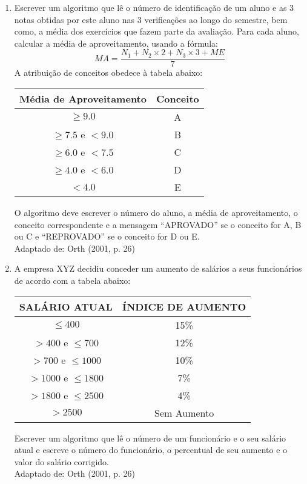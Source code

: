 \documentclass[onecolumn,a4paper,10pt]{report}
\newcommand{\+}{\, + \,}
\newcommand{\<}{\hspace*{-0.4cm}}
\begin{document}
\begin{enumerate}[1.]
\item Escrever um algoritmo que lê o número de identificação de um aluno e as $3$ notas obtidas por este aluno nas $3$ verificações ao longo do semestre, bem como, a média dos exercícios que fazem parte da avaliação. Para cada aluno, calcular a média de aproveitamento, usando a fórmula:
\[ MA = \frac{N_1 + N_2 \times 2 + N_3 \times 3 + ME}{7}\]
A atribuição de conceitos obedece à tabela abaixo:
\begin{center}
\begin{tabular}{|c|c|}
\hline
\textbf{Média de Aproveitamento} & \textbf{Conceito}\\
\hline\hline
$\geqslant 9.0$ & A \\ \hline
$\geqslant 7.5$ e $< 9.0$ & B\\ \hline
$\geqslant 6.0$ e $< 7.5$ & C \\ \hline
$\geqslant 4.0$ e $< 6.0$ & D \\ \hline
$< 4.0$ & E\\ \hline
\end{tabular}
\end{center}
O algoritmo deve escrever o número do aluno, a média de aproveitamento, o conceito correspondente e a mensagem ``APROVADO'' se o conceito for A, B ou C e ``REPROVADO'' se o conceito for D ou E.\\
{\tiny Adaptado de: Orth (2001, p. 26)}

\item A empresa XYZ decidiu conceder um aumento de salários a seus funcionários de acordo com a tabela abaixo:
\begin{center}
\begin{tabular}{|c|c|}
\hline
\textbf{SALÁRIO ATUAL} & \textbf{ÍNDICE DE AUMENTO}\\
\hline\hline
$\leq 400$ & 15\%\\ \hline
$> 400$ e $\leq 700$ & 12\%\\ \hline
$> 700$ e $\leq 1000$ & 10\%\\ \hline
$> 1000$ e $\leq 1800$ & 7\%\\ \hline
$> 1800$ e $\leq 2500$ & 4\%\\ \hline
$> 2500$ & Sem Aumento \\ \hline
\end{tabular}
\end{center}
Escrever um algoritmo que lê o número de um funcionário e o seu salário atual e escreve o número do funcionário, o percentual de seu aumento e o valor do salário corrigido.\\
{\tiny Adaptado de: Orth (2001, p. 26)}


\end{enumerate}
\end{document}
